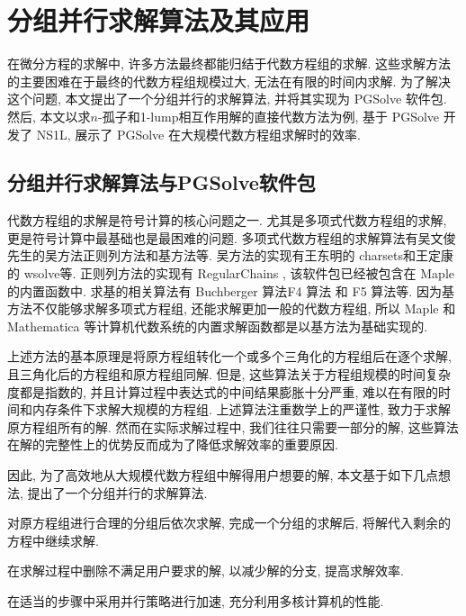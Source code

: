 \chapter{分组并行求解算法及其应用}\label{ch03}
在微分方程的求解中, 许多方法最终都能归结于代数方程组的求解. 这些求解方法的主要困难在于最终的代数方程组规模过大, 无法在有限的时间内求解. 为了解决这个问题, 本文提出了一个分组并行的求解算法, 并将其实现为 PGSolve 软件包. 然后, 本文以求$n$-孤子和1-lump相互作用解的直接代数方法为例, 基于 PGSolve 开发了 NS1L, 展示了 PGSolve 在大规模代数方程组求解时的效率. 

\section{分组并行求解算法与PGSolve软件包}
代数方程组的求解是符号计算的核心问题之一. 尤其是多项式代数方程组的求解, 更是符号计算中最基础也是最困难的问题. 多项式代数方程组的求解算法有吴文俊先生的吴方法\cite{wu1984,wu1985}\D 正则列方法\cite{kalkbrener1991three,lu1994searching}和\Grobner{}基方法\cite{adams1994introduction}等. 吴方法的实现有王东明的 charsets\cite{wang1995implementation}和王定康的 wsolve\cite{wsolve}等. 正则列方法的实现有 RegularChains \cite{maza2000triangular}, 该软件包已经被包含在 Maple 的内置函数中. 求\Grobner{}基的相关算法有 Buchberger 算法\cite{buchberger1970algorithmic}\D F4 算法\cite{faugere1999new} 和 F5 算法\cite{faugere2002new}等. 因为\Grobner{}基方法不仅能够求解多项式方程组, 还能求解更加一般的代数方程组, 所以 Maple 和 Mathematica 等计算机代数系统的内置求解函数都是以\Grobner{}基方法为基础实现的.

上述方法的基本原理是将原方程组转化一个或多个三角化的方程组后在逐个求解, 且三角化后的方程组和原方程组同解. 但是, 这些算法关于方程组规模的时间复杂度都是指数的, 并且计算过程中表达式的中间结果膨胀十分严重, 难以在有限的时间和内存条件下求解大规模的方程组. 上述算法注重数学上的严谨性, 致力于求解原方程组所有的解. 然而在实际求解过程中, 我们往往只需要一部分的解, 这些算法在解的完整性上的优势反而成为了降低求解效率的重要原因. 

因此, 为了高效地从大规模代数方程组中解得用户想要的解, 本文基于如下几点想法, 提出了一个分组并行的求解算法.
\begin{compactenum}[(1)]
\item 对原方程组进行合理的分组后依次求解, 完成一个分组的求解后, 将解代入剩余的方程中继续求解. 
\item 在求解过程中删除不满足用户要求的解, 以减少解的分支, 提高求解效率.
\item 在适当的步骤中采用并行策略进行加速, 充分利用多核计算机的性能.
\end{compactenum}

